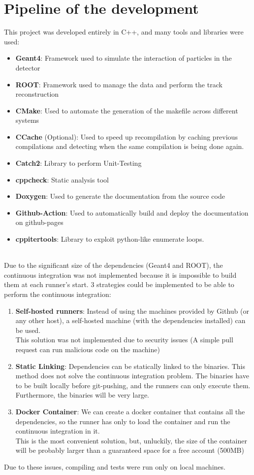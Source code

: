 \documentclass[10pt, a4paper, twocolumn]{article} %
\begin{document}
\section{Pipeline of the development}
This project was developed entirely in C++, and many tools and libraries were used:
\begin{itemize}
    \item \textbf{Geant4}: Framework used to simulate the interaction of particles in the detector
    \item \textbf{ROOT}: Framework used to manage the data and perform the track reconstruction 
    \item \textbf{CMake}: Used to automate the generation of the makefile across different systems
    \item \textbf{CCache} (Optional): Used to speed up recompilation by caching previous compilations and detecting when the same compilation is being done again.
    \item \textbf{Catch2}: Library to perform Unit-Testing
    \item \textbf{cppcheck}: Static analysis tool 
    \item \textbf{Doxygen}: Used to generate the documentation from the source code
    \item \textbf{Github-Action}: Used to automatically build and deploy the documentation on github-pages
    \item \textbf{cppitertools}: Library to exploit python-like enumerate loops.
    \end{itemize}
\\
Due to the significant size of the dependencies (Geant4 and ROOT), the continuous integration was not implemented because it is impossible to build them at each runner's start.
3 strategies could be implemented to be able to perform the continuous integration:
\begin{enumerate}
    \item \textbf{Self-hosted runners}: Instead of using the machines provided by Github (or any other host), a self-hosted machine (with the dependencies installed) can be used.\\
    This solution was not implemented due to security issues (A simple pull request can run  malicious code on the machine)
    \item \textbf{Static Linking}: Dependencies can be statically linked to the binaries. This method does not solve the continuous integration problem. The binaries have to be built locally before git-pushing, and the runners can only execute them. \\
    Furthermore, the binaries will be very large.
    \item \textbf{Docker Container}: We can create a docker container that contains all the dependencies, so the runner has only to load the container and run the continuous integration in it.\\
    This is the most convenient solution, but, unluckily, the size of the container will be probably larger than a guaranteed space for a free account (500MB)
\end{enumerate}
Due to these issues, compiling and tests were run only on local machines.
\end{document}
